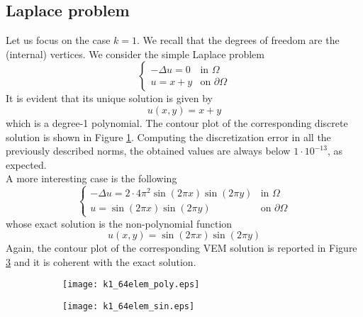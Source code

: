 \documentclass[10pt]{article}
\begin{document}
\subsection{Laplace problem}
Let us focus on the case $k=1$. We recall that the degrees of freedom are the (internal) vertices.
We consider the simple Laplace problem
\begin{equation}
	\begin{cases}
	-\Delta u = 0 & \mbox{in } \Omega \\
	u = x+y & \mbox{on } \partial \Omega
	\end{cases}
	\label{eqn:test1}
\end{equation}
It is evident that its unique solution is given by
$$u(x,y)=x+y$$
which is a degree-1 polynomial. The contour plot of the corresponding discrete solution is shown in Figure \ref{fig:polynomial}. Computing the discretization error in all the previously described norms, the obtained values are always below $1 \cdot 10^{-13}$, as expected. \\
A more interesting case is the following
\begin{equation}
\begin{cases}
-\Delta u = 2 \cdot 4 \pi^2 \sin(2\pi x) \sin(2 \pi y) & \mbox{in } \Omega \\
u = \sin(2\pi x) \sin(2 \pi y) & \mbox{on } \partial \Omega
\end{cases}
\label{eqn:test2}
\end{equation}
whose exact solution is the non-polynomial function
$$u(x,y)=\sin(2\pi x) \sin(2 \pi y)$$
Again, the contour plot of the corresponding VEM solution is reported in Figure \ref{fig:sinsin} and it is coherent with the exact solution.
\begin{figure}[H]
	\centering
	\begin{subfigure}{0.49\textwidth}
		\centering
		\texttt{[image: k1\_64elem\_poly.eps]}
		\label{fig:polynomial}
	\end{subfigure}
	\begin{subfigure}{0.49\textwidth}
		\centering
		\texttt{[image: k1\_64elem\_sin.eps]}
		\label{fig:sinsin}
	\end{subfigure}
\end{figure} 
\end{document}
